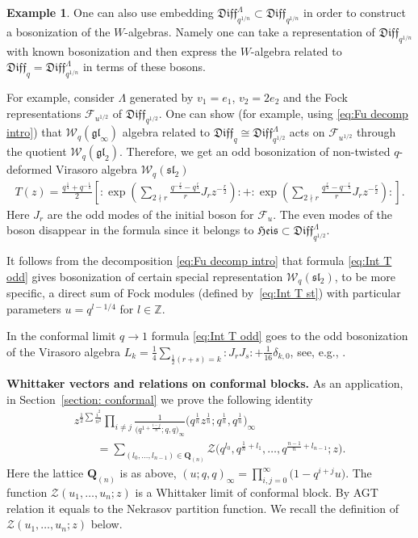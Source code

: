 \documentclass[pdftex]{sigma}
\numberwithin{equation}{section}
\theoremstyle{definition}
\newtheorem{Example}[Theorem]{Example}
\newcommand{\qd}[1]{ \mathfrak{Diff}_{q^{#1}} }
\newcommand{\qD}{\mathfrak{Diff}_q}
\newcommand{\Q}{\mathbf{Q}_{(n)}}
\begin{document}
\begin{Example}
One can also use embedding $\qd{1/n}^{\Lambda} \subset \qd{1/n}$ in order to construct a bosonization of the $W$-algebras. Namely one can take a representation of $\qd{1/n}$ with known bosonization and then express the $W$-algebra related to $\qD = \qd{1/n}^{\Lambda}$ in terms of these bosons.

For example, consider $\Lambda$ generated by $v_1=e_1$, $v_2=2e_2$ and the Fock representations $\mathcal{F}_{u^{1/2}}$ of $\qd{1/2}$. One can show (for example, using \eqref{eq:Fu decomp intro}) that $\mathcal{W}_q(\mathfrak{gl}_\infty)$ algebra related to $\qD \cong \qd{1/2}^\Lambda$ acts on $\mathcal{F}_{u^{1/2}}$ through the quotient $\mathcal{W}_q(\mathfrak{gl}_2)$. Therefore, we get an odd bosonization of non-twisted $q$-deformed Virasoro algebra $\mathcal{W}_q(\mathfrak{sl}_2)$
\begin{gather}\label{eq:Int T odd}
T (z) = \frac{q^{\frac{1}{4}}+q^{-\frac{1}{4}}}{2} \left[ : \! \exp \left( \sum_{2 \nmid r} \frac{q^{-\frac{r}{4}}-q^{\frac{r}{4}}}{r} J_r z^{-\frac{r}{2}} \right) \! : + : \! \exp \left( \sum_{2 \nmid r} \frac{q^{\frac{r}{4}}-q^{-\frac{r}{4}}}{r} J_r z^{-\frac{r}{2}} \right) \! : \right].\!\!\!
\end{gather}
Here $J_r$ are the odd modes of the initial boson for $\mathcal{F}_u$. The even modes of the boson disappear in the formula since it belongs to $\mathfrak{Heis}\subset \qd{1/2}^\Lambda$.

It follows from the decomposition \eqref{eq:Fu decomp intro} that formula \eqref{eq:Int T odd} gives bosonization of certain special representation $\mathcal{W}_q(\mathfrak{sl}_2)$, to be more specific, a direct sum of Fock modules (defined by~\eqref{eq:Int T st}) with particular parameters $u=q^{l-1/4}$ for $l \in \mathbb{Z}$.

In the conformal limit $q\rightarrow 1$ formula \eqref{eq:Int T odd} goes to the odd bosonization of the Virasoro algebra $L_k = \frac{1}{4} \sum\limits_{\frac12 (r+s)=k} : \! J_r J_s \! : + \frac{1}{16} \delta_{k,0}$, see, e.g., \cite{Z}.
\end{Example}

{\bf Whittaker vectors and relations on conformal blocks.}
As an application, in Section~\ref{section: conformal} we prove the following identity
\begin{gather}
z^{\frac12 \sum \frac{i^2}{n^2}} \prod_{i \neq j} \frac{1}{\big(q^{1+\frac{i-j}{n}}; q, q\big)_{\infty}} \big( q^{\frac{1}{n}} z^{\frac{1}{n}}; q^{\frac{1}{n}} ,q^{\frac{1}{n}} \big)_{\infty} \nonumber\\
\qquad{} = \sum_{(l_0, \dots, l_{n-1}) \in \Q} \mathcal{Z} \big( q^{l_0}, q^{\frac{1}{n}+l_1}, \dots, q^{\frac{n-1}{n} + l_{n-1}}; z \big).\label{eq:Intr relation}
\end{gather}
Here the lattice $\Q$ is as above, $(u; q, q)_{\infty} = \prod\limits_{i,j=0}^{\infty} \big(1-q^{i+j} u\big)$. The function $\mathcal{Z}(u_1,\dots,u_n;z)$ is a Whittaker limit of conformal block. By AGT relation it equals to the Nekrasov partition function. We recall the definition of $\mathcal{Z}(u_1,\dots,u_n;z)$ below.
\end{document}
